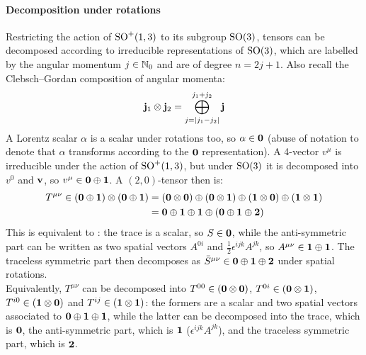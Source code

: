 \paragraph{Decomposition under rotations}

Restricting the action of $ \mathrm{SO}^+(1,3) $ to its subgroup $ \mathrm{SO}(3) $, tensors can be decomposed according to irreducible representations of $ \mathrm{SO}(3) $, which are labelled by the angular momentum $ j \in \mathbb{N}_0 $ and are of degree $ n = 2j + 1 $. Also recall the Clebsch--Gordan composition of angular momenta:
\begin{equation}
  \mathbf{j}_1 \otimes \mathbf{j}_2 = \bigoplus_{j = \left\lvert j_1 - j_2\right\rvert}^{j_1 + j_2} \mathbf{j}
\end{equation}
A Lorentz scalar $ \alpha $ is a scalar under rotations too, so $ \alpha \in \mathbf{0} $ (abuse of notation to denote that $ \alpha $ transforms according to the $ \mathbf{0} $ representation). A 4-vector $ v^\mu $ is irreducible under the action of $ \mathrm{SO}^+(1,3) $, but under $ \mathrm{SO}(3) $ it is decomposed into $ v^0 $ and $ \mathbf{v} $, so $ v^\mu \in \mathbf{0} \oplus \mathbf{1} $. A $ (2,0) $-tensor then is:
\begin{equation*}
  \begin{split}
    T^{\mu \nu} \in \left( \mathbf{0} \oplus \mathbf{1} \right) \otimes \left( \mathbf{0} \oplus \mathbf{1} \right)
    &= \left( \mathbf{0} \otimes \mathbf{0} \right) \oplus \left( \mathbf{0} \otimes \mathbf{1} \right) \oplus \left( \mathbf{1} \otimes \mathbf{0} \right) \oplus \left( \mathbf{1} \otimes \mathbf{1} \right) \\
    &= \mathbf{0} \oplus \mathbf{1} \oplus \mathbf{1} \oplus \left( \mathbf{0} \oplus \mathbf{1} \oplus \mathbf{2} \right)
  \end{split}
\end{equation*}
This is equivalent to : the trace is a scalar, so $ S \in \mathbf{0} $, while the anti-symmetric part can be written as two spatial vectors $ A^{0i} $ and $ \frac{1}{2} \epsilon^{ijk} A^{jk} $, so $ A^{\mu \nu} \in \mathbf{1} \oplus \mathbf{1} $. The traceless symmetric part then decomposes as $ \bar{S}^{\mu \nu} \in \mathbf{0} \oplus \mathbf{1} \oplus \mathbf{2} $ under spatial rotations.\\
Equivalently, $ T^{\mu \nu} $ can be decomposed into $ T^{00} \in \left( \mathbf{0} \otimes \mathbf{0} \right) $, $ T^{0i} \in \left( \mathbf{0} \otimes \mathbf{1} \right) $, $ T^{i0} \in \left( \mathbf{1} \otimes \mathbf{0} \right) $ and $ T^{ij} \in \left( \mathbf{1} \otimes \mathbf{1} \right) $: the formers are a scalar and two spatial vectors associated to $ \mathbf{0} \oplus \mathbf{1} \oplus \mathbf{1} $, while the latter can be decomposed into the trace, which is $ \mathbf{0} $, the anti-symmetric part, which is $ \mathbf{1} $ ($ \epsilon^{ijk} A^{jk} $), and the traceless symmetric part, which is $ \mathbf{2} $.

